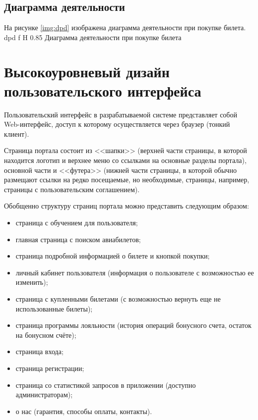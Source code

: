 \subsection*{Диаграмма деятельности}

На рисунке \ref{img:dpd} изображена диаграмма деятельности при покупке билета. 
{dpd} %
{f} %
{H} %
{0.85\textwidth} %
{Диаграмма деятельности при покупке билета} %

\newpage
\section*{Высокоуровневый дизайн пользовательского интерфейса}

Пользовательский интерфейс в разрабатываемой системе представляет собой Web-интерфейс, доступ к которому осуществляется через браузер (тонкий клиент).

Страница портала состоит из <<шапки>> (верхней части страницы, в которой находится логотип и верхнее меню со ссылками на основные разделы портала), основной части и <<футера>> (нижней части страницы, в которой обычно размещают ссылки на редко посещаемые, но необходимые, страницы, например, страницы с пользовательским соглашением).

Обобщенно структуру страниц портала можно представить следующим образом:
\begin{itemize}
    \item страница с обучением для пользователя;
    \item главная страница с поиском авиабилетов;
    \item страница подробной информацией о билете и кнопкой покупки;
    \item личный кабинет пользователя (информация о пользователе с возможностью ее изменить);
    \item страница с купленными билетами (с возможностью вернуть еще не использованные билеты);
    \item страница программы лояльности (история операций бонусного счета, остаток на бонусном счёте);
    \item страница входа;
    \item страница регистрации;
    \item страница со статистикой запросов в приложении (доступно администраторам);
    \item о нас (гарантия, способы оплаты, контакты).
\end{itemize}

